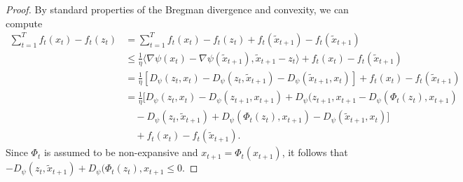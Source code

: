 \documentclass{article}
\begin{document}
\begin{proof}
  By standard properties of the Bregman divergence and convexity, we can compute
  \begin{align*}
    \sum_{t = 1}^T f_t(x_t) - f_t(z_t)
    & = \sum_{t = 1}^T f_t(x_t) - f_t(z_t) + f_t(\tilde{x}_{t+1})  - f_t(\tilde{x}_{t+1}) \\
    &\leq \frac{1}{\eta} \langle \nabla \psi(x_t) - \nabla \psi(\tilde{x}_{t+1}), \tilde{x}_{t+1} - z_t \rangle + f_t(x_t) - f_t(\tilde{x}_{t+1}) \\
    & = \frac{1}{\eta} \left[ D_\psi(z_t, x_t) - D_\psi(z_t, \tilde{x}_{t+1}) - D_\psi(\tilde{x}_{t+1}, x_t) \right] + f_t(x_t) - f_t(\tilde{x}_{t+1}) \\
    & = \frac{1}{\eta} \Big[ D_\psi(z_t, x_t) - D_\psi(z_{t+1}, x_{t+1}) + D_\psi(z_{t+1}, x_{t+1} - D_\psi(\Phi_t(z_t), x_{t+1}) \\
    &\quad - D_\psi(z_t, \tilde{x}_{t+1}) + D_\psi(\Phi_t(z_t), x_{t+1}) - D_\psi(\tilde{x}_{t+1}, x_t)\Big] \\
    &\quad + f_t(x_t) - f_t(\tilde{x}_{t+1}). 
  \end{align*}
  Since $\Phi_t$ is assumed to be non-expansive and $x_{t+1} = \Phi_t(x_{t+1})$, it follows that $ - D_\psi(z_t, \tilde{x}_{t+1}) + D_\psi(\Phi_t(z_t), x_{t+1} \leq 0$.
 

\end{proof}
\end{document}
